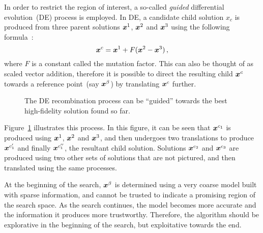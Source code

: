 In order to restrict the region of interest, a so-called \emph{guided} differential evolution~(DE) process is employed. In DE, a candidate child solution $x_c$ is produced from three parent solutions $\boldsymbol{x}^1$, $\boldsymbol{x}^2$ and $\boldsymbol{x}^3$ using the following formula~\cite{storn1997differential}:
\begin{equation}
\boldsymbol{x}^c = \boldsymbol{x}^1 + F(\boldsymbol{x}^2 - \boldsymbol{x}^3)\,,
\end{equation}
where $F$ is a constant called the mutation factor. This can also be thought of as scaled vector addition, therefore it is possible to direct the resulting child $\boldsymbol{x}^c$ towards a reference point~(say $\boldsymbol{x}^\beta$) by translating $\boldsymbol{x}^c$ further.


\begin{figure}[h!]
\centering
{}
\caption{The DE recombination process can be ``guided'' towards the best high-fidelity solution found so far.}\label{fig:guide-DE}
\end{figure}

Figure~\ref{fig:guide-DE} illustrates this process. In this figure, it can be seen that $\boldsymbol{x}^{c_1}$ is produced using $\boldsymbol{x}^1$, $\boldsymbol{x}^2$ and $\boldsymbol{x}^3$, and then undergoes two translations to produce $\boldsymbol{x}^{c_1'}$ and finally $\boldsymbol{x}^{c_1''}$, the resultant child solution. Solutions $\boldsymbol{x}^{c_2}$ and $\boldsymbol{x}^{c_3}$ are produced using two other sets of solutions that are not pictured, and then translated using the same processes. 

At the beginning of the search, $\boldsymbol{x}^\beta$ is determined using a very coarse model built with sparse information, and cannot be trusted to indicate a promising region of the search space. As the search continues, the model becomes more accurate and the information it produces more trustworthy. Therefore, the algorithm should be explorative in the beginning of the search, but exploitative towards the end. 

